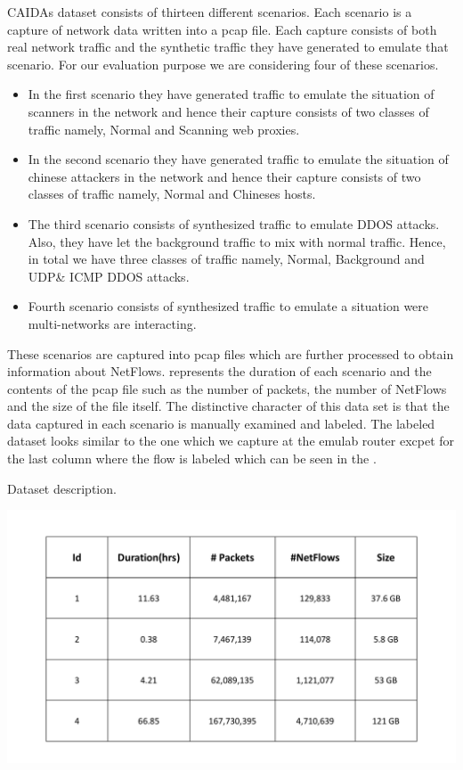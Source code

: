 CAIDAs dataset consists of thirteen different scenarios. Each scenario is a capture of network data written into a pcap file. Each capture consists of both real network traffic and the synthetic traffic they have generated to emulate that scenario. For our evaluation purpose we are considering four of these scenarios.

\begin{itemize}
	\item In the first scenario they have generated traffic to emulate the situation of scanners in the network and hence their capture consists of two classes of traffic namely,  Normal and Scanning web proxies.
	\item In the second scenario they have generated traffic to emulate the situation of chinese attackers in the network and hence their capture consists of two classes of traffic namely,  Normal and Chineses hosts.
	\item The third scenario consists of synthesized traffic to emulate DDOS attacks. Also, they have let the background traffic to mix with normal traffic. Hence, in total we have three classes of traffic namely, Normal, Background and UDP\& ICMP DDOS attacks.
	\item Fourth scenario consists of synthesized traffic to emulate a situation were multi-networks are interacting. 

\end{itemize}

 These scenarios are captured into pcap files which are further processed to obtain information about NetFlows.  represents the duration of each scenario and the contents of the pcap file such as the number of packets, the number of NetFlows and the size of the file itself. The distinctive character of this data set is that the data captured in each scenario is manually examined and labeled. The labeled dataset looks similar to the one which we capture at the emulab router excpet for the last column where the flow is labeled which can be seen in the .


\begin{table}[t]
	\caption{Dataset description.}%
	\centerline{\includegraphics[scale = 0.5]{synth_desc.pdf}}	
\end{table}

